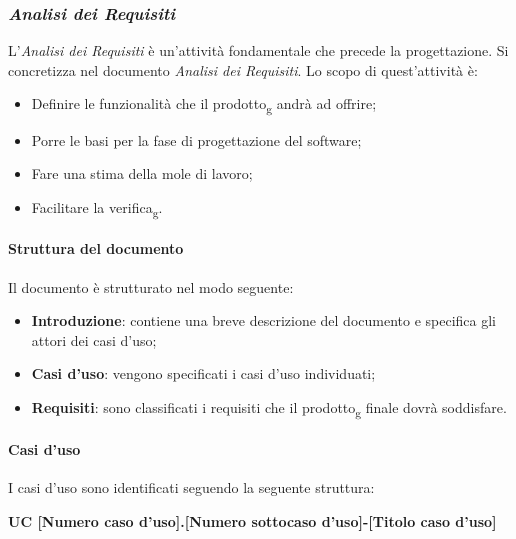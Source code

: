 \subsubsection{\textit{Analisi dei Requisiti}}
L’\textit{Analisi dei Requisiti} è un’attività fondamentale che precede la progettazione. 
Si concretizza nel documento \textit{Analisi dei Requisiti}. Lo scopo di quest’attività è:
    \begin{itemize}
        \item Definire le funzionalità che il prodotto\textsubscript{g} andrà ad offrire;
        \item Porre le basi per la fase di progettazione del software;
        \item Fare una stima della mole di lavoro;
        \item Facilitare la verifica\textsubscript{g}. 
    \end{itemize}

\paragraph{Struttura del documento} Il documento è strutturato nel modo seguente:
    \begin{itemize}
        \item \textbf{Introduzione}: contiene una breve descrizione del documento e specifica gli attori dei casi d’uso;
		\item \textbf{Casi d’uso}: vengono specificati i casi d’uso individuati;
		\item \textbf{Requisiti}: sono classificati i requisiti che il prodotto\textsubscript{g} finale dovrà soddisfare.
    \end{itemize}

\paragraph{Casi d’uso} 

I casi d’uso sono identificati seguendo la seguente struttura:

\begin{center}\textbf{UC [Numero caso d’uso].[Numero sottocaso d’uso]-[Titolo caso d’uso]}\end{center}

